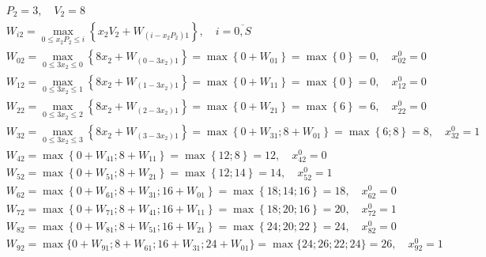 \begin{align*}
     & P_2 = 3, \quad V_2 = 8                                                                                                                                                          \\
     & W_{i2} = \max\limits_{0 \leq x_2P_2 \leq i} \left\{x_2V_2 + W_{(i - x_2P_2)1}\right\}, \quad i = \overline{0, S}                                                                \\
     & W_{02} = \max\limits_{0 \leq 3x_2 \leq 0} \left\{8x_2 + W_{(0 - 3x_2)1}\right\} = \max \left\{0 + W_{01}\right\} = \max \left\{0\right\} = 0, \quad x_{02}^0 = 0                \\
     & W_{12} = \max\limits_{0 \leq 3x_2 \leq 1} \left\{8x_2 + W_{(1 - 3x_2)1}\right\} = \max \left\{0 + W_{11}\right\} = \max \left\{0\right\} = 0, \quad x_{12}^0 = 0                \\
     & W_{22} = \max\limits_{0 \leq 3x_2 \leq 2} \left\{8x_2 + W_{(2 - 3x_2)1}\right\} = \max \left\{0 + W_{21}\right\} = \max \left\{6\right\} = 6, \quad x_{22}^0 = 0                \\
     & W_{32} = \max\limits_{0 \leq 3x_2 \leq 3} \left\{8x_2 + W_{(3 - 3x_2)1}\right\} = \max \left\{0 + W_{31}; 8 + W_{01}\right\} = \max \left\{6; 8\right\} = 8, \quad x_{32}^0 = 1 \\
     & W_{42} = \max \left\{0 + W_{41}; 8 + W_{11}\right\} = \max \left\{12; 8\right\} = 12, \quad x_{42}^0 = 0                                                                        \\
     & W_{52} = \max \left\{0 + W_{51}; 8 + W_{21}\right\} = \max \left\{12; 14\right\} = 14, \quad x_{52}^0 = 1                                                                       \\
     & W_{62} = \max \left\{0 + W_{61}; 8 + W_{31}; 16 + W_{01}\right\} = \max \left\{18; 14; 16\right\} = 18, \quad x_{62}^0 = 0                                                      \\
     & W_{72} = \max \left\{0 + W_{71}; 8 + W_{41}; 16 + W_{11}\right\} = \max \left\{18; 20; 16\right\} = 20, \quad x_{72}^0 = 1                                                      \\
     & W_{82} = \max \left\{0 + W_{81}; 8 + W_{51}; 16 + W_{21}\right\} = \max \left\{24; 20; 22\right\} = 24, \quad x_{82}^0 = 0                                                      \\
     & W_{92} = \max \{0 + W_{91}; 8 + W_{61}; 16 + W_{31}; 24 + W_01\} = \max \{24; 26; 22; 24\} = 26, \quad x_{92}^0 = 1                                                             \\

\end{align*}
